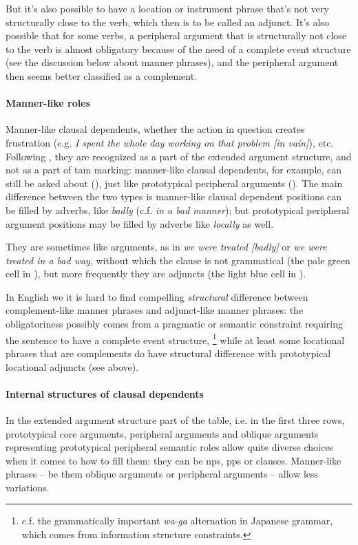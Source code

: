 \documentclass[UTF8, a4paper, oneside, scheme=plain, 12pt]{ctexbook}
\newcommand*{\citesec}[1]{\S~{#1}}
\newcommand{\form}[1]{\emph{#1}}
\begin{document}
But it's also possible to have a location or instrument phrase 
that's not very structurally close to the verb, 
which then is to be called an adjunct.
It's also possible that for some verbs, 
a peripheral argument that is structurally not close to the verb 
is almost obligatory because of the need of a complete event structure 
(see the discussion below about manner phrases), 
and the peripheral argument then seems better classified as a complement. 

\paragraph*{Manner-like roles}
Manner-like clausal dependents, whether the action in question creates frustration 
(e.g. \form{I spent the whole day working on that problem [in vain]}), etc.
Following \citet[\citesec{1.5}]{cinque1999adverbs}, 
they are recognized as a part of the extended argument structure, 
and not as a part of \acs{tam} marking:
manner-like clausal dependents, for example,  
can still be asked about (), 
just like prototypical peripheral arguments (). 
The main difference between the two types 
is manner-like clausal dependent positions can be filled by adverbs, like 
\form{badly} (c.f. \form{in a bad manner});
but prototypical peripheral argument positions may be filled 
by adverbs like \form{locally} as well.

They are sometimes like arguments, 
as in \form{we were treated [badly]} or \form{we were treated in a bad way},
without which the clause is not grammatical
(the pale green cell in ),
but more frequently they are adjuncts
(the light blue cell in ).

In English we it is hard to find compelling \emph{structural} difference 
between complement-like manner phrases and adjunct-like manner phrases: 
the obligatoriness possibly comes from a pragmatic or semantic constraint 
requiring the sentence to have a complete event structure,%
\footnote{
    c.f. the grammatically important \form{wa}-\form{ga} alternation in Japanese grammar, 
    which comes from information structure constraints. 
}
while at least some locational phrases that are complements 
do have structural difference with prototypical locational adjuncts (see above).

\paragraph*{Internal structures of clausal dependents} 
In the extended argument structure part of the table, i.e. 
in the first three rows,
prototypical core arguments,
peripheral arguments and oblique arguments representing prototypical peripheral semantic roles 
allow quite diverse choices when it comes to how to fill them:
they can be \ac{np}s, \ac{pp}s or clauses.
Manner-like phrases -- be them oblique arguments or peripheral arguments -- 
allow less variations.
\end{document}

